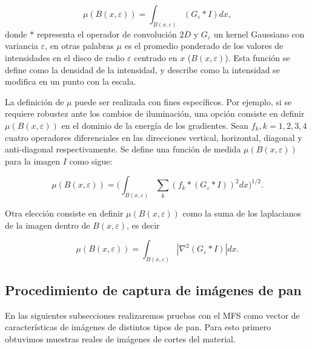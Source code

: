 \begin{equation}
\mu(B(x,\varepsilon)) = \int_{B(x,\varepsilon)}{(G_{\varepsilon} \ast I)} dx,
\label{eqn:eqn11}
\end{equation}
donde $\ast$ representa el operador de convolución $2D$ y $G_{\varepsilon}$ un kernel Gaussiano con variancia $\varepsilon$, en otras palabras $\mu$ es el promedio ponderado de los valores de intensidades en el disco de radio $\varepsilon$ centrado en $x$ ($B(x,\varepsilon)$).
Esta función se define como la densidad de la intensidad, y describe como la intensidad se modifica en un punto con la escala.

La definición de $\mu$ puede ser realizada con fines específicos.
Por ejemplo, si se requiere robustez ante los cambios de iluminación, una opción consiste en definir $\mu(B(x,\varepsilon))$ en el dominio de la energía de los gradientes.
Sean ${ f_{k} , k = 1, 2, 3, 4}$ cuatro operadores diferenciales en las direcciones vertical, horizontal, diagonal y anti-diagonal respectivamente.
Se define una función de medida $\mu(B(x,\varepsilon))$ para la imagen $I$ como sigue:

\begin{equation}
\mu(B(x,\varepsilon)) = (\int_{B(x,\varepsilon)}{\sum_{k}{(f_{k} \ast (G_{\varepsilon} \ast I))^{2}} dx)^{1/2}}.
\label{eqn:gradient}
\end{equation}

Otra elección consiste en definir $\mu(B(x, \varepsilon))$ como la suma de los laplacianos de la imagen dentro de $B(x, \varepsilon)$, es decir

\begin{equation}
\mu(B(x,\varepsilon)) = \int_{B(x,\varepsilon)}|\nabla^2 (G_{\varepsilon} \ast I)| dx.
\label{eqn:laplacian}
\end{equation}

\subsection{Procedimiento de captura de imágenes de pan}
En las siguientes subsecciones realizaremos pruebas con el MFS como vector de características de imágenes de distintos tipos de pan.
Para esto primero obtuvimos muestras reales de imágenes de cortes del material.

